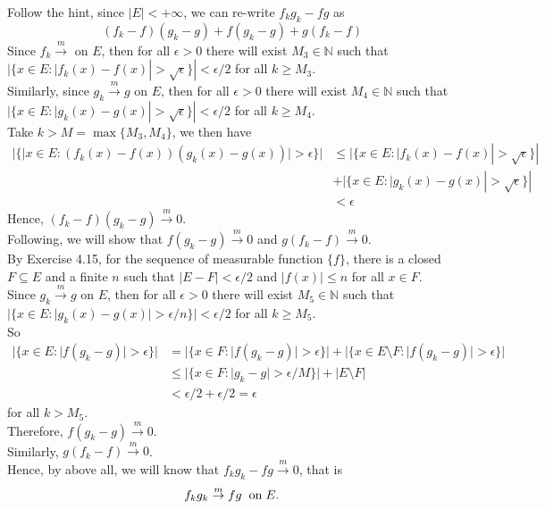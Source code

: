 \documentclass[a4paper,11pt]{article}
\begin{document}
\begin{enumerate}
\begin{enumerate}
Follow the hint, since $|E| < +\infty$, we can re-write $f_kg_k - fg$ as $$(f_k - f)(g_k - g) + f(g_k - g) + g(f_k - f)$$
Since $f_k \overset{m}{\to}$ on $E$, then for all $\epsilon > 0$ there will exist $M_3 \in \mathbb{N}$ such that \\$|\{ x \in E : | f_k(x) - f(x) | > \sqrt{\epsilon} \}| < \epsilon / 2$ for all $k \geq M_3$.\\
Similarly, since $g_k \overset{m}{\to} g$ on $E$, then for all $\epsilon > 0$ there will exist $M_4 \in \mathbb{N}$ such that \\$|\{ x \in E : | g_k(x) - g(x) | > \sqrt{\epsilon} \}| < \epsilon / 2$ for all $k \geq M_4$.\\
Take $k > M = \max\{ M_3, M_4\}$, we then have
$$\begin{aligned}
|\{ |x \in E : (f_k(x) - f(x))(g_k(x) - g(x))| > \epsilon \}|
&\leq |\{ x \in E : | f_k(x) - f(x) | > \sqrt{\epsilon} \}|\\
&+ |\{ x \in E : | g_k(x) - g(x) | > \sqrt{\epsilon} \}|\\
&< \epsilon
\end{aligned}$$
Hence, $(f_k - f)(g_k - g) \overset{m}{\to} 0$.\\

Following, we will show that $f(g_k - g) \overset{m}{\to} 0$ and $g(f_k - f) \overset{m}{\to} 0$.\\
By Exercise 4.15, for the sequence of measurable function $\{ f \}$, there is a closed $F \subseteq E$ and a finite $n$ such that $|E - F| < \epsilon / 2$ and $|f(x)| \leq n$ for all $x \in F$.\\
Since $g_k \overset{m}{\to} g$ on $E$, then for all $\epsilon > 0$ there will exist $M_5 \in \mathbb{N}$ such that \\$|\{ x \in E : | g_k(x) - g(x) | > \epsilon / n \}| < \epsilon / 2$ for all $k \geq M_5$.\\
So
$$\begin{aligned}
|\{x \in E : |f(g_k - g)| > \epsilon \}|
&= |\{ x \in F : |f(g_k - g)| > \epsilon \}| + |\{ x \in E \setminus F : |f(g_k - g)| > \epsilon \}|\\
& \leq |\{ x \in F : |g_k - g| > \epsilon / M \}| + |E \setminus F|\\
& < \epsilon / 2 + \epsilon / 2 = \epsilon
\end{aligned}$$
for all $k > M_5$.\\
Therefore, $f(g_k - g) \overset{m}{\to} 0$.\\
Similarly, $g(f_k - f) \overset{m}{\to} 0$.\\
Hence, by above all, we will know that $f_k g_k - fg \overset{m}{\to} 0$, that is
$$f_k g_k \overset{m}{\to} fg \hspace{0.2 cm} \mathrm{on} \hspace{0.1cm} E.$$\


\end{enumerate}
\end{enumerate}
\end{document}
